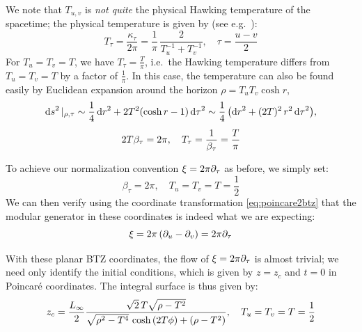 \documentclass[11pt,a4paper]{article}
\begin{document}
	We note that $T_{u,v}$ is \textit{not quite} the physical Hawking temperature of the spacetime; the physical temperature is given by (see e.g.~\cite{Compere:2018aar}):
	\begin{equation}
		T_\tau = \frac{\kappa_\tau}{2\pi}
		= \frac{1}{\pi}\,
			\frac{2}{T_u^{-1} + T_v^{-1}},
	\quad
		\tau = \frac{u - v}{2}
	\end{equation}
	For $T_u = T_v = T$, we have $T_\tau = \frac{T}{\pi}$, i.e.~the Hawking temperature differs from $T_u = T_v = T$ by a factor of $\frac{1}{\pi}$. In this case, the temperature can also be found easily by Euclidean expansion around the horizon $\rho = T_u T_v \cosh r$,
	\begin{gather}
		\dd{s}^2|_{\rho,\tau}
		\sim \frac{1}{4} \dd{r}^2
			+ 2T^2 \pqty{\cosh r - 1}
				\dd{\tau}^2
		\sim \frac{1}{4}\,\pqty{
				\dd{r}^2
				+ (2T)^2\,r^2 \dd{\tau}^2
			},
	\\[1ex]
		2T\beta_\tau = 2\pi,
	\quad
		T_\tau = \frac{1}{\beta_\tau} = \frac{T}{\pi}
	\end{gather}
	
	To achieve our normalization convention $\xi = 2\pi \partial_{\tau}$ as before, we simply set:
	\begin{equation}
		\beta_\tau = 2\pi,
	\quad
		T_u = T_v = T = \frac{1}{2}
	\end{equation}
	We can then verify using the coordinate transformation \eqref{eq:poincare2btz} that the modular generator in these coordinates is indeed what we are expecting:
	\begin{equation}
		\xi
		= 2\pi\,(\partial_{u} - \partial_{v})
		= 2\pi\partial_{\tau}
	\end{equation}
	
	With these planar BTZ coordinates, the flow of $\xi = 2\pi\partial_{\tau}$ is almost trivial; we need only identify the initial conditions, which is given by $z = z_c$ and $t = 0$ in Poincar\'e coordinates. The integral surface is thus given by:
	\begin{equation}
		z_c = \frac{L_\infty}{2} \frac{
				\sqrt{2}\,T
				\sqrt{\rho - T^2}
			}{
				\sqrt{\rho^2 - T^4}
					\,\cosh\,(2T\phi)
				+ \pqty{\rho - T^2}
			},
	\quad
		T_u = T_v = T = \frac{1}{2}
	\end{equation}
	
\end{document}
